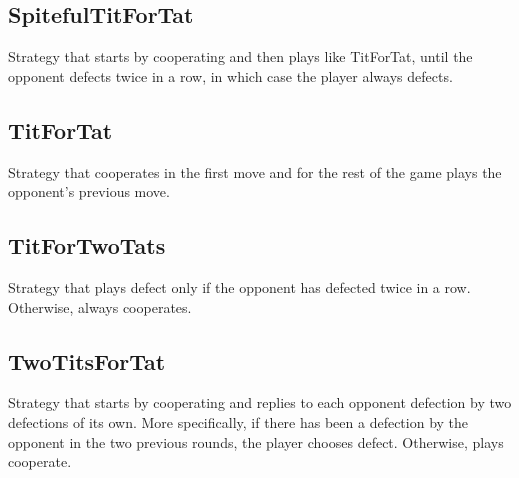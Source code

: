 \documentclass[12pt]{article}
\begin{document}
\subsection{SpitefulTitForTat}
Strategy that starts by cooperating and then plays like TitForTat, until the opponent defects twice in a row, in which case the player always defects.

\subsection{TitForTat}
Strategy that cooperates in the first move and for the rest of the game plays the opponent's previous move.

\subsection{TitForTwoTats}
Strategy that plays defect only if the opponent has defected twice in a row. Otherwise, always cooperates.

\subsection{TwoTitsForTat}
Strategy that starts by cooperating and replies to each opponent defection by two defections of its own. More specifically, if there has been a defection by the opponent in the two previous rounds, the player chooses defect. Otherwise, plays cooperate.
\end{document}
